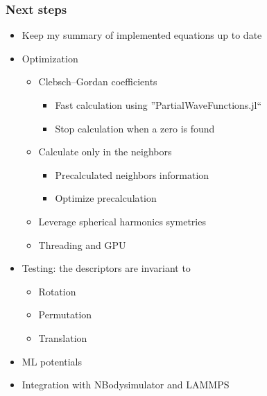 \documentclass[10pt]{beamer}
\theoremstyle{remark}
\theoremstyle{definition}
\begin{document}
\begin{frame}
\frametitle{Next steps}
\small
\begin{itemize}
\item Keep my summary of implemented equations up to date \checkmark
\pause
\item Optimization
	\begin{itemize}
   	 \item Clebsch–Gordan coefficients
   	     \begin{itemize}
   	 		\item Fast calculation using ''PartialWaveFunctions.jl`` \checkmark
			\item Stop calculation when a zero is found \checkmark
    	\end{itemize} 
    \item Calculate only in the neighbors
        \begin{itemize}
    		\item Precalculated neighbors information \checkmark
    		\item Optimize precalculation
    	\end{itemize}
	\item Leverage spherical harmonics symetries
	\item Threading and GPU
	\end{itemize}
\pause
\item Testing: the descriptors are invariant to 
	\begin{itemize}
	 \item Rotation \checkmark
   	 \item Permutation
   	 \item Translation
\end{itemize}
\pause
\item ML potentials
\pause
\item Integration with NBodysimulator and LAMMPS
\end{itemize}


\end{frame}


\end{document}
